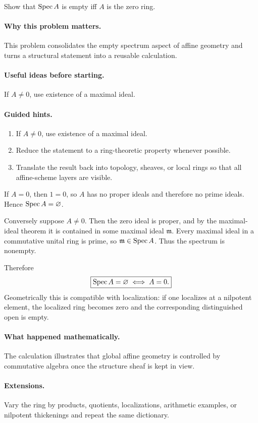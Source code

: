 \begin{problem}\label{prob:vi18-p08}
Show that $\operatorname{Spec} A$ is empty iff $A$ is the zero ring.
\end{problem}

\ifdefined\FullProblemDossiers
\paragraph{Why this problem matters.}
This problem consolidates the empty spectrum aspect of affine geometry and turns a structural statement into a reusable calculation.

\paragraph{Useful ideas before starting.}
If $A\neq0$, use existence of a maximal ideal.

\paragraph{Guided hints.}
\begin{enumerate}
\item If $A\neq0$, use existence of a maximal ideal.
\item Reduce the statement to a ring-theoretic property whenever possible.
\item Translate the result back into topology, sheaves, or local rings so that all affine-scheme layers are visible.
\end{enumerate}

\begin{solution}
If $A=0$, then $1=0$, so $A$ has no proper ideals and therefore no prime ideals. Hence $\operatorname{Spec} A=\varnothing$.

Conversely suppose $A\neq0$. Then the zero ideal is proper, and by the maximal-ideal theorem it is contained in some maximal ideal $\mathfrak m$. Every maximal ideal in a commutative unital ring is prime, so $\mathfrak m\in\operatorname{Spec} A$. Thus the spectrum is nonempty.

Therefore
\[
\boxed{\operatorname{Spec} A=\varnothing\iff A=0.}
\]
Geometrically this is compatible with localization: if one localizes at a nilpotent element, the localized ring becomes zero and the corresponding distinguished open is empty.
\end{solution}


\paragraph{What happened mathematically.}
The calculation illustrates that global affine geometry is controlled by commutative algebra once the structure sheaf is kept in view.

\paragraph{Extensions.}
Vary the ring by products, quotients, localizations, arithmetic examples, or nilpotent thickenings and repeat the same dictionary.
\fi
